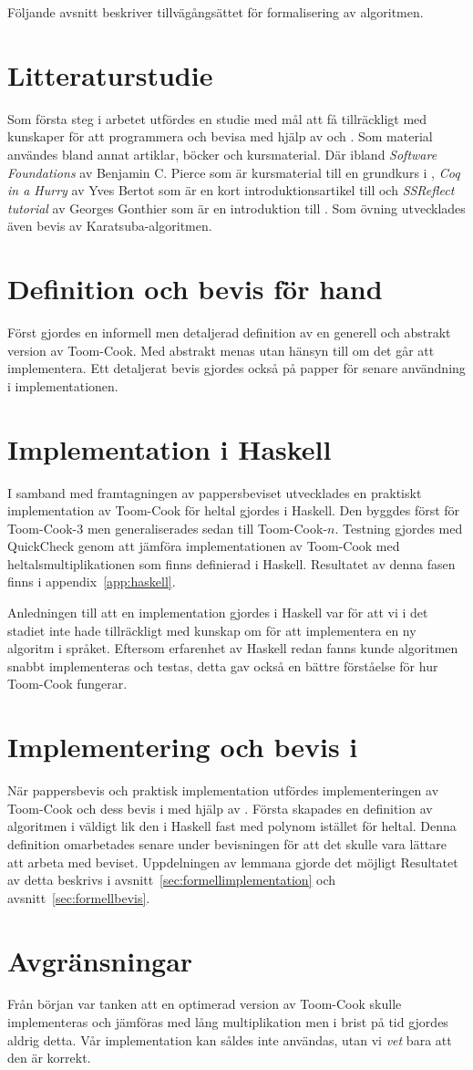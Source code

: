 Följande avsnitt beskriver tillvägångsättet för formalisering av algoritmen.

\section{Litteraturstudie}
Som första steg i arbetet utfördes en studie med mål att få tillräckligt med
kunskaper för att programmera och bevisa med hjälp av \coq och \ssr. Som
material användes bland annat artiklar, böcker och kursmaterial. Där ibland
\emph{Software Foundations} av Benjamin C. Pierce som är kursmaterial till en
grundkurs i \coq, \emph{Coq in a Hurry} av Yves Bertot som är en kort
introduktionsartikel till \coq och \emph{SSReflect tutorial} av Georges
Gonthier som är en introduktion till \ssr. Som övning utvecklades även bevis av
Karatsuba-algoritmen.

\section{Definition och bevis för hand}
Först gjordes en informell men detaljerad definition av en generell och
abstrakt version av Toom-Cook. Med abstrakt menas utan hänsyn till om det går
att implementera. Ett detaljerat bevis gjordes också på papper för senare
användning i implementationen.

\section{Implementation i Haskell}
I samband med framtagningen av pappersbeviset utvecklades en praktiskt
implementation av Toom-Cook för heltal gjordes i Haskell. Den byggdes först för
Toom-Cook-3 men generaliserades sedan till Toom-Cook-$n$. Testning gjordes med
QuickCheck genom att jämföra implementationen av Toom-Cook med
heltalsmultiplikationen som finns definierad i Haskell. Resultatet av denna
fasen finns i appendix~\ref{app:haskell}.

Anledningen till att en implementation gjordes i Haskell var för att vi i det
stadiet inte hade tillräckligt med kunskap om \coq för att implementera en ny
algoritm i språket. Eftersom erfarenhet av Haskell redan fanns kunde algoritmen
snabbt implementeras och testas, detta gav också en bättre förståelse för hur
Toom-Cook fungerar.

\section{Implementering och bevis i \coq}
När pappersbevis och praktisk implementation utfördes implementeringen av
Toom-Cook och dess bevis i \coq med hjälp av \ssr. Första skapades en
definition av algoritmen i \coq väldigt lik den i Haskell fast med polynom
istället för heltal. Denna definition omarbetades senare under bevisningen för
att det skulle vara lättare att arbeta med beviset. Uppdelningen av lemmana
gjorde det möjligt Resultatet av detta
beskrivs i avsnitt~\ref{sec:formellimplementation} och
avsnitt~\ref{sec:formellbevis}.

\section{Avgränsningar}
Från början var tanken att en optimerad version av Toom-Cook skulle
implementeras och jämföras med lång multiplikation men i brist på tid gjordes
aldrig detta. Vår implementation kan såldes inte användas, utan vi \emph{vet}
bara att den är korrekt.
